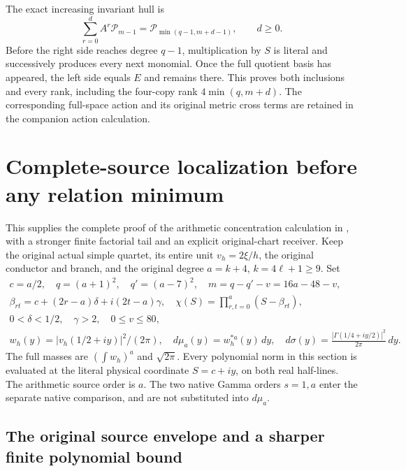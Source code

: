 The exact increasing invariant hull is
\[
 \sum_{r=0}^{d}A^r\mathcal P_{m-1}
      =\mathcal P_{\min(q-1,m+d-1)},\qquad d\ge0.
 \tag{COI17}
\]
Before the right side reaches degree $q-1$, multiplication by $S$
is literal and successively produces every next monomial. Once
the full quotient basis has appeared, the left side equals $E$
and remains there. This proves both inclusions and every rank,
including the four-copy rank $4\min(q,m+d)$.
The corresponding full-space action and its original metric cross
terms are retained in the companion action calculation.


\section{Complete-source localization before any relation minimum}

This supplies the complete proof of the arithmetic concentration
calculation in \cite{a03cm:program:arrival03-08}, with a stronger finite
factorial tail and an explicit original-chart receiver.
Keep the original actual simple quartet, its entire unit $v_h=2\xi/h$,
the original conductor and branch, and the original degree
$a=k+4$, $k=4\ell+1\ge9$. Set
\[
 \begin{gathered}
 c=a/2,\quad q=(a+1)^2,\quad q'=(a-7)^2,\quad
 m=q-q'-v=16a-48-v,\\
 \beta_{rt}=c+(2r-a)\delta+i(2t-a)\gamma,\quad
 \chi(S)=\prod_{r,t=0}^{a}(S-\beta_{rt}),\\
 0<\delta<1/2,\quad\gamma>2,\quad0\le v\le80,\\
 w_h(y)=|v_h(1/2+iy)|^2/(2\pi),\quad
 d\mu_a(y)=w_h^{*a}(y)\,dy,\quad
 d\sigma(y)=\frac{|\Gamma(1/4+iy/2)|^2}{2\pi}\,dy.
 \end{gathered}                                                   \tag{CAL1}
\]
The full masses are $(\int w_h)^a$ and $\sqrt{2\pi}$.
Every polynomial norm in this section is evaluated at the literal
physical coordinate $S=c+iy$, on both real half-lines. The arithmetic
source order is $a$. The two native Gamma orders $s=1,a$ enter the
separate native comparison, and are not substituted into $d\mu_a$.

\subsection{The original source envelope and a sharper finite polynomial bound}

